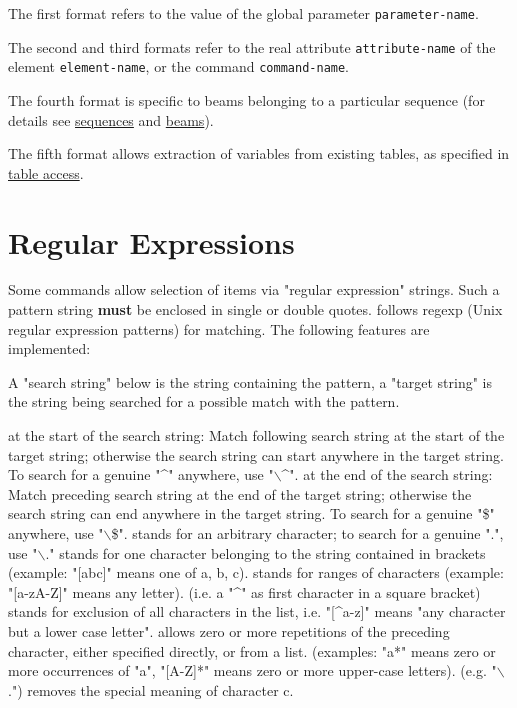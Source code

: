 The first format refers to the value of the global parameter
\texttt{parameter-name}.

The second and third formats refer to the real attribute
\texttt{attribute-name} of the element  \texttt{element-name}, or the
command \texttt{command-name}.  

The fourth format is specific
to beams belonging to a particular sequence (for details see
\hyperref[chap:sequence]{sequences} and \hyperref[chap:beam]{beams}). 

The fifth format allows extraction of variables from existing tables, as specified in
\hyperref[chap:tables]{table access}.  



%
\section{Regular Expressions}
\label{sec:regex}
Some commands allow selection of items via "regular expression"
strings. Such a pattern string \textbf{must} be enclosed in single or
double quotes. \madx follows regexp (Unix regular expression patterns)
for matching. The following features are implemented:  

A "search string" below is the string containing the pattern, a "target
string" is the string being searched for a possible match with the
pattern. 

\begin{madlist}
    at the start of the search string: Match
     following search string at the start of the target string;
     otherwise the search string can start anywhere in the target
     string. To search for a  genuine "\textasciicircum" anywhere, use
     "$\backslash$\textasciicircum".  
    at the end of the search string: Match preceding search
     string at the end of the target string; otherwise the search string
     can end anywhere in the target string. To search for a  genuine
     "\$" anywhere, use "$\backslash$\$".
    stands for an arbitrary character; to search for a genuine
     ".", use "$\backslash$."
    stands for one character belonging to the string
     contained in brackets (example: "[abc]" means one of a, b, c).  
    stands for ranges of characters (example:
     "[a-zA-Z]" means any letter).  
    (i.e. a "\textasciicircum" as first
     character in a square bracket) stands for exclusion of all
     characters in the list, i.e. "[\textasciicircum a-z]" means "any
     character but a lower case letter". 
    allows zero or more repetitions of the preceding
     character, either specified directly, or from a list. (examples:
     "a*" means zero or more occurrences of "a",  "[A-Z]*" means zero or
     more upper-case letters).  
     (e.g. "$\backslash$.") removes the special
     meaning of character c.  
\end{madlist}

